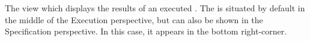 \item[\gdtestresultview]{
The view which displays the results of an executed \gdsuite{}. The  
\gdtestresultview
 is situated by default in the middle of the Execution perspective, but can also be shown in the Specification perspective. In this case, it appears in the 
bottom right-corner.
}

